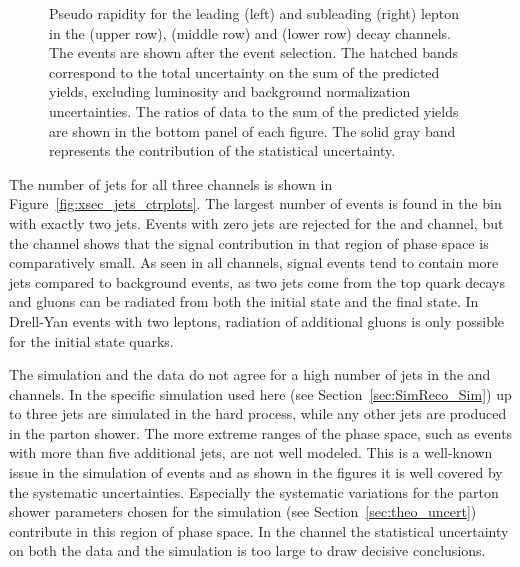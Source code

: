 \begin{figure}[htbp!]
\begin{center}
      \caption{Pseudo rapidity for the leading (left) and subleading (right)
        lepton in the \emu (upper row), \mumu (middle row) and \ee (lower row) decay channels.
        The events are shown after the
        event selection.  The hatched
        bands correspond to the total uncertainty on the sum of the
        predicted yields, 
        excluding luminosity and background
        normalization uncertainties. 
        The ratios of data to the sum of the predicted yields are
        shown in the bottom panel of each figure. The solid gray band
        represents the contribution of the statistical uncertainty.}  
       \label{fig:xsec_eta_ctrplots}
  \end{center}
\end{figure}



The number of jets for all three channels is shown in Figure~\ref{fig:xsec_jets_ctrplots}.
The largest number of \ttbar events is found in the bin with exactly two jets. 
Events with zero jets are rejected for the \ee and \mumu channel, but the \emu channel shows that the signal
contribution in that region of phase space is comparatively small.
As seen in all channels, \ttbar signal events tend to contain more jets compared to background events, as two jets come from the top quark decays and gluons can be radiated from both the initial state and the final state. 
In Drell-Yan events with two leptons, radiation of additional gluons is only possible for the initial state quarks.

The simulation and the data do not agree for a high number of jets in the \emu and \mumu channels.
In the specific simulation used here (see Section~\ref{sec:SimReco_Sim}) up to three jets are simulated in the hard process, while any other jets are produced in the parton shower.
The more extreme ranges of the phase space, such as events with more than five additional jets, are not well modeled.
This is a well-known issue in the simulation of \ttbar events and as shown in the figures it is well covered by the systematic uncertainties. Especially the systematic variations for the parton shower parameters chosen for the simulation
(see Section~\ref{sec:theo_uncert}) contribute in this region of phase space.
In the \ee channel the statistical uncertainty on both the data and the simulation is too large to draw decisive conclusions.

